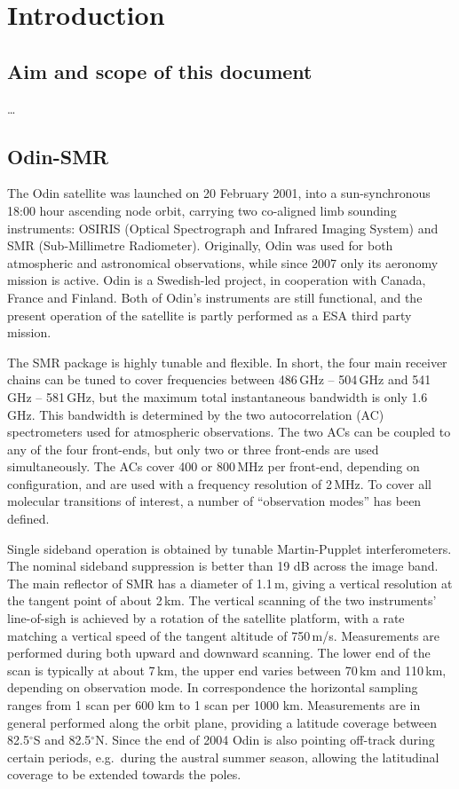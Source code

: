 \chapter{Introduction}
\label{chapter:introduction}

\setcounter{page}{1}


\section{Aim and scope of this document}
\label{sec:aim}
%
\dots


\section{Odin-SMR}
\label{sec:odin}
%
The Odin satellite was launched on 20 February 2001, into a sun-synchronous 18:00 hour
ascending node orbit, carrying two co-aligned limb sounding instruments: OSIRIS
(Optical Spectrograph and Infrared Imaging System) and SMR (Sub-Millimetre
Radiometer). Originally, Odin was used for both atmospheric and astronomical
observations, while since 2007 only its aeronomy mission
\citep{murtagh:anove:02} is active. Odin is a Swedish-led project, in
cooperation with Canada, France and Finland. Both of Odin's instruments are
still functional, and the present operation of the satellite is partly
performed as a ESA third party mission. 

The SMR package is highly tunable and flexible. In short, the four main
receiver chains can be tuned to cover frequencies between 486\,GHz -- 504\,GHz and
541\,GHz -- 581\,GHz, but the maximum total instantaneous bandwidth is only
1.6\,GHz. This bandwidth is determined by the two autocorrelation (AC)
spectrometers used for atmospheric observations. The two ACs can be coupled to
any of the four front-ends, but only two or three front-ends are used
simultaneously. The ACs cover 400 or 800\,MHz per front-end, depending on
configuration, and are used with a frequency resolution of 2\,MHz. To cover all
molecular transitions of interest, a number of ``observation modes'' has been
defined.

Single sideband operation is obtained by tunable Martin-Pupplet
interferometers. The nominal sideband suppression is better than 19 dB across
the image band. The main reflector of SMR has a diameter of 1.1\,m, giving a
vertical resolution at the tangent point of about 2\,km. The vertical scanning
of the two instruments' line-of-sigh is achieved by a rotation of the satellite
platform, with a rate matching a vertical speed of the tangent altitude of
750\,m/s. Measurements are performed during both upward and downward scanning.
The lower end of the scan is typically at about 7\,km, the upper end varies
between 70\,km and 110\,km, depending on observation mode. In correspondence
the horizontal sampling ranges from 1 scan per 600 km to 1 scan per 1000 km.
Measurements are in general performed along the orbit plane, providing a
latitude coverage between 82.5$^{\circ}$S and 82.5$^{\circ}$N. Since the end of
2004 Odin is also pointing off-track during certain periods, e.g.\ during the
austral summer season, allowing the latitudinal coverage to be extended towards
the poles. 


